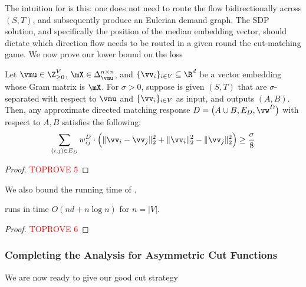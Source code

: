 \documentclass[letterpaper]{article}
\begin{document}
The intuition for \dirroundcut is this: one does not need to route the flow bidirectionally across $(S, T)$, and subsequently produce an Eulerian demand graph. The SDP solution, and specifically the position of the median embedding vector, should dictate which direction flow needs to be routed in a given round the cut-matching game. We now prove our lower bound on the loss

\begin{lemma}
\label{lem.asym-cut-strat.loss}
Let $\vmu \in \Z_{\geq 0}^V$, $\mX \in \Delta_{\vmu}^{n \times n}$, and $\{ \vv_i \}_{i \in V} \subseteq \R^d$ be a vector embedding whose Gram matrix is $\mX$. For $\sigma > 0$, suppose \dirroundcut is given $(S, T)$ that are $\sigma$-separated with respect to $\vmu$ and $\{ \vv_i \}_{i \in V}$ as input, and outputs $(A, B)$. Then, any approximate directed matching response $D = \big( A \cup B, E_D, \vw^D \big)$ with respect to $A, B$ satisfies the following:
\begin{equation*}
\sum_{(i, j) \in E_D} w_{ij}^D \cdot \Big( \lVert \vv_i - \vv_j \rVert_2^2 + \lVert \vv_i \rVert_2^2 - \lVert \vv_j \rVert_2^2 \Big)
\geq \frac{\sigma}{8}
\end{equation*}
\end{lemma}
\begin{proof}\textcolor{red}{TOPROVE 5}\end{proof}

We also bound the running time of \dirroundcut.

\begin{lemma}
\label{lem.asym-cut-strat.dirroundcut-runtime}
\dirroundcut runs in time $O(nd + n \log n)$ for $n = \lvert V \rvert$.
\end{lemma}
\begin{proof}\textcolor{red}{TOPROVE 6}\end{proof}

\subsubsection{Completing the Analysis for Asymmetric Cut Functions}

We are now ready to give our good cut strategy
\end{document}
